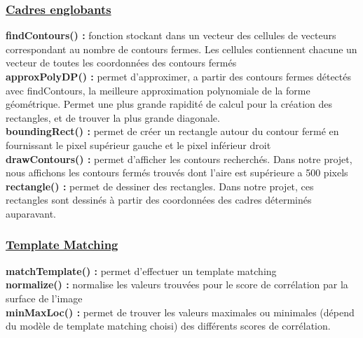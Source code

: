 \documentclass[10pt,a4paper]{report}
\begin{document}
\subsubsection{\underline{Cadres englobants}}
\textbf{findContours() :} fonction stockant dans un vecteur des cellules de vecteurs correspondant au nombre de contours fermes. Les cellules contiennent chacune un vecteur de toutes les coordonnées des contours fermés\\
\newline
\textbf{approxPolyDP() :} permet d'approximer, a partir des contours fermes détectés avec findContours, la meilleure approximation polynomiale de la forme géométrique. Permet une plus grande rapidité de calcul pour la création des rectangles, et de trouver la plus grande diagonale.\\
\newline
\textbf{boundingRect() :} permet de créer un rectangle autour du contour fermé en fournissant le pixel supérieur gauche et le pixel inférieur droit\\
\newline
\textbf{drawContours() :} permet d'afficher les contours recherchés. Dans notre projet, nous affichons les contours fermés trouvés dont l'aire est supérieure a 500 pixels\\
\newline
\textbf{rectangle() :} permet de dessiner des rectangles. Dans notre projet, ces rectangles sont dessinés à partir des coordonnées des cadres déterminés auparavant.\\
\subsubsection{\underline{Template Matching}}
\textbf{matchTemplate() :} permet d'effectuer un template matching\\
\newline
\textbf{normalize() :} normalise les valeurs trouvées pour le score de corrélation par la surface de l'image\\
\newline
\textbf{minMaxLoc() :} permet de trouver les valeurs maximales ou minimales (dépend du modèle de template matching choisi) des différents scores de corrélation.
\end{document}
